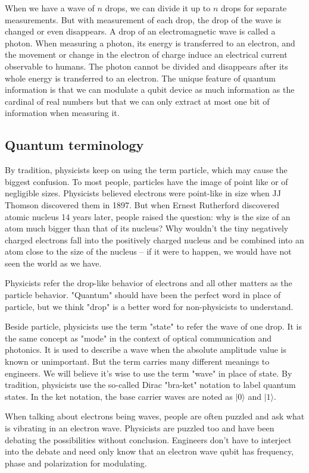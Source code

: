 \documentclass{book}
\newcommand\keta[2][]{#1\lvert {#2} #1\rangle}
\begin{document}
When we have a wave of $n$ drops, we can divide it up to $n$ drops for separate measurements. But with measurement of each drop, the drop of the wave is changed or even disappears. A drop of an electromagnetic wave is called a photon. When measuring a photon, its energy is transferred to an electron, and the movement or change in the electron of charge induce an electrical current observable to humans. The photon cannot be divided and disappears after its whole energy is transferred to an electron. The unique feature of quantum information is that we can modulate a qubit device as much information as the cardinal of real numbers but that we can only extract at most one bit of information when measuring it.

\subsection{Quantum terminology}
By tradition, physicists keep on using the term particle, which may cause the biggest confusion. To most people, particles have the image of point like or of negligible sizes. Physicists believed electrons were point-like in size when JJ Thomson discovered them in 1897. But when Ernest Rutherford discovered atomic nucleus 14 years later, people raised the question: why is the size of an atom much bigger than that of its nucleus? Why wouldn't the tiny negatively charged electrons fall into the positively charged nucleus and be combined into an atom close to the size of the nucleus -- if it were to happen, we would have not seen the world as we have.

Physicists refer the drop-like behavior of electrons and all other matters as the particle behavior. "Quantum" should have been the perfect word in place of particle, but we think "drop" is a better word for non-physicists to understand.

Beside particle, physicists use the term "state" to refer the wave of one drop. It is the same concept as "mode" in the context of optical communication and photonics. It is used to describe a wave when the absolute amplitude value is known or unimportant. But the term carries many different meanings to engineers. We will believe it's wise to use the term "wave" in place of state. By tradition, physicists use the so-called Dirac "bra-ket" notation to label quantum states. In the ket notation, the base carrier waves are noted as $\keta{0}$ and $\keta{1}$.

When talking about electrons being waves, people are often puzzled and ask what is vibrating in an electron wave. Physicists are puzzled too and have been debating the possibilities without conclusion. Engineers don't have to interject into the debate and need only know that an electron wave qubit has frequency, phase and polarization for modulating.
\end{document}

